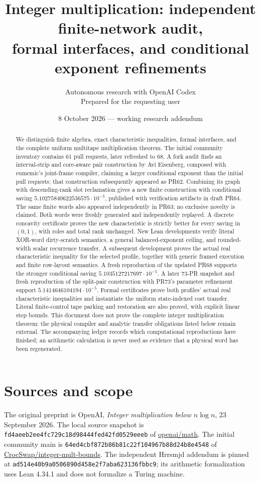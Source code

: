 \documentclass[11pt]{article}
\title{Integer multiplication: independent finite-network audit,\protect\\
formal interfaces, and conditional exponent refinements}
\author{Autonomous research with OpenAI Codex\\Prepared for the requesting user}
\date{8 October 2026 --- working research addendum}
\begin{document}
\maketitle
\begin{abstract}
We distinguish finite algebra, exact characteristic inequalities, formal
interfaces, and the complete uniform multitape multiplication theorem.
The initial community inventory contains 61 pull requests, later refreshed to 68. A fork audit finds
an interval-strip and core-aware pair construction by Avi Eisenberg, composed
with eumemic's joint-frame compiler, claiming a larger conditional exponent
than the initial pull requests; that construction subsequently appeared as PR62.
Combining its graph with descending-rank slot reclamation gives a new finite
construction with conditional saving $5.10275840622536575\cdot10^{-5}$,
published with verification artifacts in draft PR64. The same finite words
also appeared independently in PR63; no exclusive novelty is claimed.
Both words were freshly generated and independently replayed. A discrete
concavity certificate proves the new characteristic is strictly better for
every saving in $(0,1)$, with roles and total rank unchanged.
New Lean developments verify literal XOR-word dirty-scratch semantics,
a general balanced-exponent ceiling, and rounded-width scalar recurrence transfer.
A subsequent development proves the actual real characteristic inequality
for the selected profile, together with generic framed execution and finite
row-layout semantics. A fresh reproduction of the updated PR68 supports the stronger
conditional saving $5.1035127217697\cdot10^{-5}$. A later 73-PR snapshot and
fresh reproduction of the split-pair construction with PR73's parameter
refinement support $5.1414646104194\cdot10^{-5}$. Formal certificates
prove both profiles' actual real characteristic inequalities and instantiate
the uniform state-indexed cost transfer. Literal finite-control tape parking
and restoration are also proved, with explicit linear step bounds. This document
does not prove the complete integer multiplication theorem: the physical
compiler and analytic transfer obligations listed below remain external.
The accompanying ledger records which computational reproductions have
finished; an arithmetic calculation is never used as evidence that a physical
word has been regenerated.
\end{abstract}

\section{Sources and scope}
The original preprint is OpenAI, \emph{Integer multiplication below
$n\log n$}, 23 September 2026. The local source snapshot is
\texttt{fd4aeeb2ee4fc729c18d98444fed42fd0529eeeb} of
\href{https://github.com/openai/math}{openai/math}.
The initial community main is
\texttt{64ed4cbf872b86b81c22f104967b88d24b8e4548} of
\href{https://github.com/CrocSwap/integer-mult-bounds}{CrocSwap/integer-mult-bounds}.
The independent Hrrsmjd addendum is pinned at
\texttt{ad514e40b9a0506890d458e2f7aba623136fbbc9}; its arithmetic
formalization uses Lean 4.34.1 and does not formalize a Turing machine.
\end{document}
